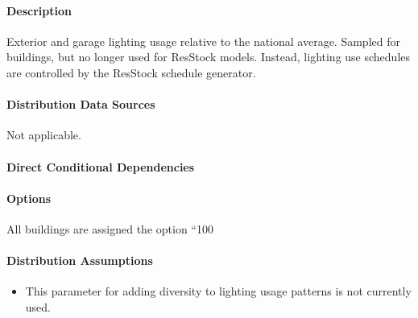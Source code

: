 \paragraph{Description}
% 
Exterior and garage lighting usage relative to the national average. Sampled for buildings, but no longer used for ResStock models. Instead, lighting use schedules are controlled by the ResStock schedule generator. 

\paragraph{Distribution Data Sources}
% 
Not applicable. 

\paragraph{Direct Conditional Dependencies}


\paragraph{Options}
All buildings are assigned the option ``100%

\paragraph{Distribution Assumptions}
% 
\begin{itemize}
 \item
  This parameter for adding diversity to lighting usage patterns is not
  currently used.
\end{itemize}
